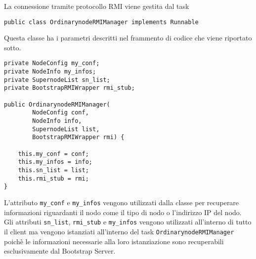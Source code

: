 La connessione tramite protocollo RMI viene gestita dal task
\begin{verbatim}
public class OrdinarynodeRMIManager implements Runnable
\end{verbatim}

Questa classe ha i parametri descritti nel frammento di codice che viene riportato sotto.
\begin{lstlisting}
private NodeConfig my_conf;
private NodeInfo my_infos;
private SupernodeList sn_list;
private BootstrapRMIWrapper rmi_stub;

public OrdinarynodeRMIManager(
		NodeConfig conf,
		NodeInfo info,
		SupernodeList list,
		BootstrapRMIWrapper rmi) {
		
	this.my_conf = conf;
	this.my_infos = info;
	this.sn_list = list;
	this.rmi_stub = rmi;
}
\end{lstlisting}
L'attributo \verb|my_conf| e \verb|my_infos| vengono utilizzati dalla classe per recuperare informazioni riguardanti il nodo come il tipo di nodo o l'indirizzo IP del nodo.
Gli attributi \verb|sn_list|, \verb|rmi_stub| e \verb|my_infos| vengono utilizzati all'interno di tutto il client ma vengono istanziati all'interno del task \verb|OrdinarynodeRMIManager| poichè le informazioni necessarie alla loro istanziazione sono recuperabili esclusivamente dal Bootstrap Server.

